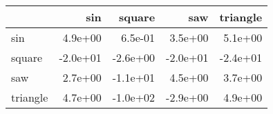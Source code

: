 \begin{tabular}{lrrrr}
\toprule
{} &      sin &   square &      saw &  triangle \\
\midrule
sin      &  4.9e+00 &  6.5e-01 &  3.5e+00 &   5.1e+00 \\
square   & -2.0e+01 & -2.6e+00 & -2.0e+01 &  -2.4e+01 \\
saw      &  2.7e+00 & -1.1e+01 &  4.5e+00 &   3.7e+00 \\
triangle &  4.7e+00 & -1.0e+02 & -2.9e+00 &   4.9e+00 \\
\bottomrule
\end{tabular}
